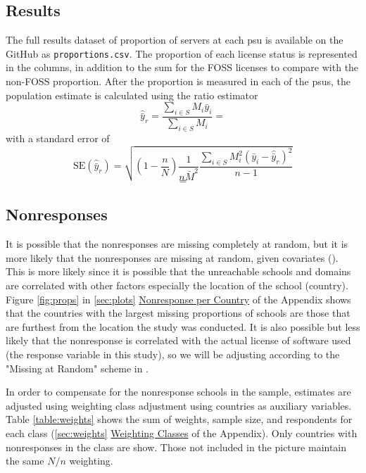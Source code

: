 \documentclass{article}
\theoremstyle{definition}
\begin{document}
\begin{flushleft}
\begin{multicols}{2}
\section{Results}
The full results dataset of proportion of servers at
each psu is available on the GitHub as \texttt{proportions.csv}.
The proportion of each license status is represented in the columns,
in addition to the sum for the FOSS licenses to compare with the
non-FOSS proportion. After the proportion is measured in each of
the psus, the population estimate is calculated using the
ratio estimator
$$
	\hat{\bar{y}}_r
	=
	\frac{
		\sum_{i \in S} M_i\bar{y}_i
	}{
		\sum_{i \in S} M_i
	}
	=
$$
with a standard error of
$$
	\textrm{SE}(\hat{\bar{y}}_r)
	=
	\sqrt{
		\left(
			1 - \frac{n}{N}
		\right)
		\frac{1}{n\bar{M}^2}
		\frac{
			\sum_{i \in S}M_i^2\left(\bar{y}_i-\hat{\bar{y}}_r\right)^2
		}{
			n-1
		}
	}
$$
$$
=
$$

\subsection{Nonresponses}
It is possible that the nonresponses are missing completely at random,
but it is more likely that the nonresponses are missing at random, given
covariates (\cite{lohr2019}). This is more likely since it is possible that
the unreachable schools and domains are correlated with other factors especially
the location of the school (country). Figure \ref{fig:props} in \autoref{sec:plots}
\hyperref[sec:plots]{Nonresponse per Country}
of the Appendix shows that the countries with the largest missing proportions
of schools are those that are furthest from the location the study was conducted.
It is also possible but less likely that
the nonresponse is correlated with the actual license of software used (the
response variable in this study), so we will be adjusting according to
the "Missing at Random" scheme in \cite{lohr2019}.

In order to compensate for the nonresponse schools
in the sample, estimates are adjusted using weighting
class adjustment using countries as auxiliary variables. Table
\ref{table:weights} shows the
sum of weights, sample size, and respondents for each class
(\autoref{sec:weights} \hyperref[sec:weights]{Weighting Classes} of
the Appendix).
Only countries with nonresponses in the class are show.
Those not included in the picture maintain the same $N/n$ weighting.


\end{multicols}
\end{flushleft}
\end{document}
